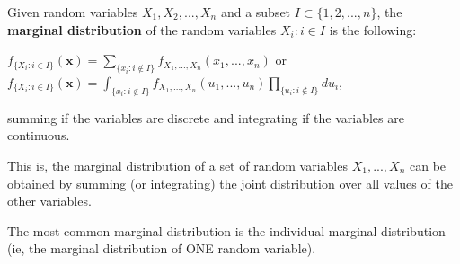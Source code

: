 \documentclass{article}
\begin{document}
Given random variables $X_1, X_2, ... , X_n$ and a subset $I \subset \{1,2,...,n\}$, the \textbf{marginal distribution} of the random variables ${X_i : i \in I}$ is the following: \\

\par$f_{\{X_i : i \in I\}}(\mathbf{x}) = \sum_{\{x_i : i \notin I\}}^{}{ f_{X_1,...,X_n}(x_1,...,x_n) }$  or\\
$f_{\{X_i : i \in I\}}(\mathbf{x}) = \int_{\{x_i : i \notin I\}}^{}{ f_{X_1,...,X_n}(u_1,...,u_n) \prod_{ \{u_i : i \notin I\} }^{} du_i}$, \\
\par
summing if the variables are discrete and integrating if the variables are continuous.\\
\par
This is, the marginal distribution of a set of random variables $X_1,...,X_n$ can be obtained by summing (or integrating) the joint distribution over all values of the other variables.\\
\par
The most common marginal distribution is the individual marginal distribution (ie, the marginal distribution of ONE random variable).
\end{document}
